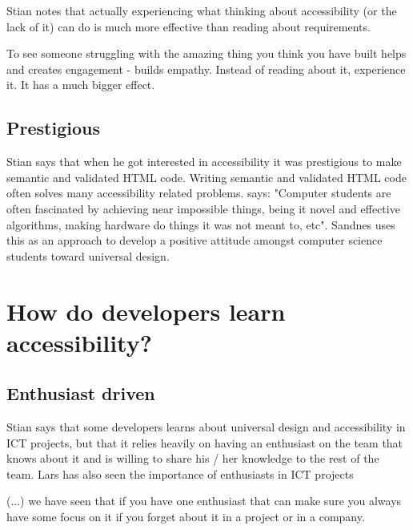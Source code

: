 Stian notes that actually experiencing what thinking about accessibility  (or the lack of it) can do is much more effective than reading about requirements.

\begin{displayquote}
    To see someone struggling with the amazing thing you think you have built helps and creates engagement - builds empathy. Instead of reading about it, experience it. It has a much bigger effect.
\end{displayquote}

\subsection{Prestigious}
Stian says that when he got interested in accessibility it was prestigious to make semantic and validated HTML code. Writing semantic and validated HTML code often solves many accessibility related problems. \textcite{sandnes} says: "Computer students are often fascinated by achieving near impossible things, being it novel and effective algorithms, making hardware do things it was not meant to, etc". Sandnes uses this as an approach to develop a positive attitude amongst computer science students toward universal design.


\section{How do developers learn accessibility?}

\subsection{Enthusiast driven}
Stian says that some developers learns about universal design and accessibility in ICT projects, but that it relies heavily on having an enthusiast on the team that knows about it and is willing to share his / her knowledge to the rest of the team. Lars has also seen the importance of enthusiasts in ICT projects 

\begin{displayquote}
    (...) we have seen that if you have one enthusiast that can make sure you always have some focus on it if you forget about it in a project or in a company.
\end{displayquote}

